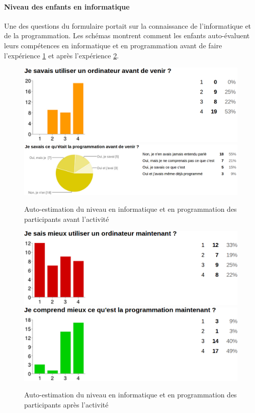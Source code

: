 \paragraph{Niveau des enfants en informatique}
Une des questions du formulaire portait sur la connaissance de l'informatique et de la programmation. Les schémas montrent comment les enfants auto-évaluent leurs compétences en informatique et en programmation avant de faire l'expérience \ref{fig:niveau-avant} et après l'expérience \ref{fig:niveau-apres}.
\begin{figure}
  \begin{center}
    \includegraphics[width=.7\textwidth]{content/8-validation/images/avant}
    \includegraphics[width=\textwidth]{content/8-validation/images/programmation}
    \caption{Auto-estimation du niveau en informatique et en programmation des participants avant l'activité}
    \label{fig:niveau-avant}
  \end{center}
\end{figure}

\begin{figure}
  \begin{center}
    \includegraphics[width=.7\textwidth]{content/8-validation/images/apres}
    \includegraphics[width=.7\textwidth]{content/8-validation/images/apres-programmation}
    \caption{Auto-estimation du niveau en informatique et en programmation des participants après l'activité}
    \label{fig:niveau-apres}
  \end{center}
\end{figure}

